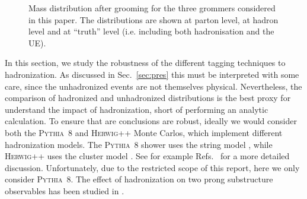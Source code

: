 \documentclass[11pt,letterpaper]{article}
\newcommand{\pythia}{\textsc{Pythia~8}\xspace}
\newcommand{\herwig}{\textsc{Herwig++}\xspace}
\DeclareRobustCommand{\Sec}[1]{Sec.~\ref{#1}}
\DeclareRobustCommand{\Refs}[1]{Refs.~\cite{#1}}
\begin{document}
\begin{figure}
  \caption{Mass distribution after grooming for the three grommers
    considered in this paper. The distributions are shown at parton
    level, at hadron level and at ``truth'' level (i.e. including both
    hadronisation and the UE).}\label{fig:mass-distribution}
\end{figure}








In this section, we study the robustness of the different tagging techniques to hadronization.
%
As discussed in \Sec{sec:pres} this must be interpreted with some care, since the unhadronized events are not themselves physical.
%
Nevertheless, the comparison of hadronized and unhadronized distributions is the best proxy for understand the impact of hadronization, short of performing an analytic calculation.
%
To ensure that are conclusions are robust, ideally we would consider both the \pythia and \herwig Monte Carlos, which implement different hadronization models.
%
The \pythia shower uses the string model \cite{Andersson:1983ia,Andersson:1998tv}, while \herwig uses the cluster model \cite{Webber:1983if,Marchesini:1987cf}.
%
See for example \Refs{Buckley:2011ms,Skands:2011pf,Skands:2012ts} for a more detailed discussion. Unfortunately, due to the restricted scope of this report, here we only consider \pythia.
%
The effect of hadronization on two prong substructure observables has been studied in \cite{Larkoski:2015kga,Salam:2016yht}.
\end{document}
